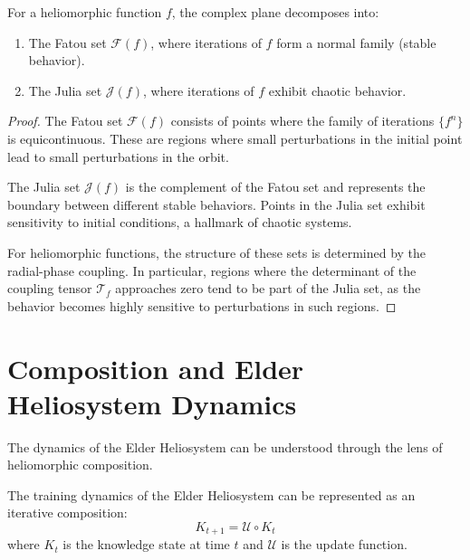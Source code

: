 \begin{theorem}
For a heliomorphic function $f$, the complex plane decomposes into:
\begin{enumerate}
    \item The Fatou set $\mathcal{F}(f)$, where iterations of $f$ form a normal family (stable behavior).
    \item The Julia set $\mathcal{J}(f)$, where iterations of $f$ exhibit chaotic behavior.
\end{enumerate}
\end{theorem}

\begin{proof}
The Fatou set $\mathcal{F}(f)$ consists of points where the family of iterations $\{f^n\}$ is equicontinuous. These are regions where small perturbations in the initial point lead to small perturbations in the orbit.

The Julia set $\mathcal{J}(f)$ is the complement of the Fatou set and represents the boundary between different stable behaviors. Points in the Julia set exhibit sensitivity to initial conditions, a hallmark of chaotic systems.

For heliomorphic functions, the structure of these sets is determined by the radial-phase coupling. In particular, regions where the determinant of the coupling tensor $\mathcal{T}_f$ approaches zero tend to be part of the Julia set, as the behavior becomes highly sensitive to perturbations in such regions.
\end{proof}

\section{Composition and Elder Heliosystem Dynamics}

The dynamics of the Elder Heliosystem can be understood through the lens of heliomorphic composition.

\begin{theorem}
The training dynamics of the Elder Heliosystem can be represented as an iterative composition:
\begin{equation}
K_{t+1} = \mathcal{U} \circ K_t
\end{equation}
where $K_t$ is the knowledge state at time $t$ and $\mathcal{U}$ is the update function.
\end{theorem}

